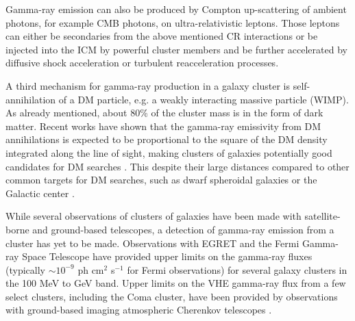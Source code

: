 \documentclass[12pt,manuscript]{aastex}
\begin{document}
Gamma-ray emission can also be produced by Compton up-scattering of ambient photons, for example CMB photons, on ultra-relativistic leptons. Those leptons can either be secondaries from the above mentioned CR interactions or be injected into the ICM by powerful cluster members and be further accelerated by diffusive shock acceleration or turbulent reacceleration processes.

A third mechanism for gamma-ray production in a galaxy cluster is self-annihilation of a DM particle, e.g. a weakly interacting massive particle (WIMP). As already mentioned, about 80\% of the cluster mass is in the form of dark matter. Recent works \citep{article:EvansFerrerSarkar:2004, article:BergstromHooper:2006} have shown that the gamma-ray emissivity from DM annihilations is expected to be proportional to the square of the DM density integrated along the line of sight, making clusters of galaxies potentially good
candidates for DM searches \citep{article:PinzkePfrommerBergstrom2009, article:Cuesta_etal:2011}. This despite their large distances compared to other common targets for DM searches, such as dwarf spheroidal galaxies \citep{article:Strigari_etal:2007, article:Acciari_etal:2010,article:Aliu_etal:2009} or the Galactic center \citep{article:Kosack_etal:2004, article:Aharonian_etal:2006, article:Aharonian_etal:2009b}.

While several observations of clusters of galaxies have been made with satellite-borne and ground-based telescopes, a detection of gamma-ray emission from a cluster has yet to be made.  Observations with EGRET
\citep{article:Sreekumar_etal:1996, article:Reimer_etal:2003} and the Fermi Gamma-ray Space Telescope \citep{article:Ackermann_etal:2010} have provided upper limits on the gamma-ray fluxes (typically $\sim10^{-9}$ ph cm$^{2}$ s$^{-1}$ for Fermi observations) for several galaxy clusters in the 100 MeV to GeV
band. Upper limits on the VHE gamma-ray flux from a few select clusters, including the Coma cluster, have been provided by observations with ground-based imaging atmospheric Cherenkov telescopes \citep[IACTs;][]{article:Perkins_etal:2006, inproc:Perkins_etal:2008, article:Aharonian_etal:2009a, article:Aleksic_etal:2010}.
\end{document}
